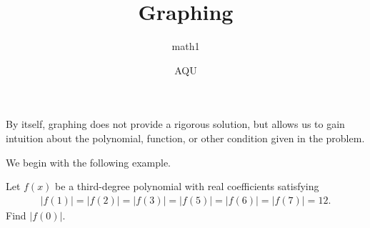 \documentclass[mast]{lucky}
\title{Graphing}
\author{math1}
\date{AQU}
\begin{document}
\maketitle

By itself, graphing does not provide a rigorous solution, but allows us to gain intuition about the polynomial, function, or other condition given in the problem.

We begin with the following example.

\begin{exam}[AIME I 2015/10]
    Let $f(x)$ be a third-degree polynomial with real coefficients satisfying
    \begin{align*}
        |f(1)|=|f(2)|=|f(3)|=|f(5)|=|f(6)|=|f(7)|=12.
    \end{align*}
    Find $|f(0)|$.
\end{exam}
\end{document}
